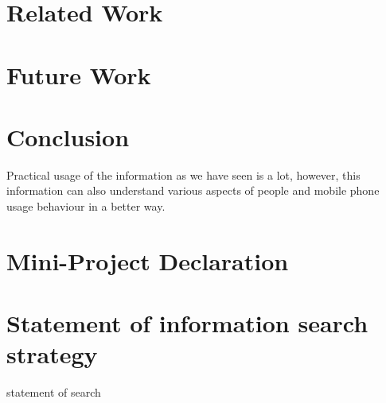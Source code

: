 \documentclass[12pt]{report}
\begin{document}
\chapter{Related Work}
\chapter{Future Work}
\chapter{Conclusion}
Practical usage of the information as we have seen is a lot, however, this information can also understand various aspects of people and mobile phone usage behaviour in a better way.





\appendix
\chapter{Mini-Project Declaration}


\chapter{Statement of information search strategy}

statement of search
\end{document}
